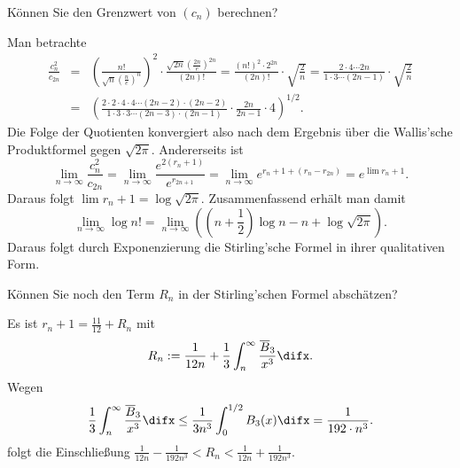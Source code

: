   \begin{frage}
    Können Sie den Grenzwert von $(c_n)$ berechnen?
  \end{frage}

  \begin{antwort}
    Man betrachte  
    \begin{eqnarray*}
      \frac{c_n^2}{c_{2n} } &=& 
      \left( \frac{n!}{\sqrt{n} \left( \frac{n}{e} \right)^n } \right)^2 
      \cdot 
      \frac{ \sqrt{2n} \left( \frac{2n}{e} \right)^{2n} }{(2n)!}  =
      \frac{ (n!)^2 \cdot 2^{2n} }{ (2n)! } \cdot \sqrt{\frac{2}{n} } 
      =
      \frac{ 2\cdot 4 \cdots 2n }{ 1\cdot 3 \cdots (2n-1) } 
      \cdot \sqrt{\frac{2}{n} } \\
      &=& \left( 
        \frac{ 
          2\cdot 2\cdot 4\cdot 4 \cdots (2n-2)\cdot (2n-2) }
        { 1\cdot 3 \cdot 3 \cdots (2n-3)\cdot (2n-1) }
        \cdot\frac{2n}{ 2n-1} \cdot 4 
      \right)^{1/2}.
    \end{eqnarray*}
    Die Folge der Quotienten 
    konvergiert also nach dem Ergebnis über die 
    Wallis'sche Produktformel gegen $\sqrt{2\pi}$. 
    Andererseits ist 
    \[
    \lim_{n\to\infty} \frac{c_n^2}{c_{2n} } = \lim_{n\to\infty} 
    \frac{e^{2(r_n+1)}}{e^{r_{2n+1}}} = 
    \lim_{n\to\infty} e^{r_n+1 + (r_n-r_{2n})} = e^{\lim r_n+1}.
    \]
    Daraus folgt $\lim r_n+1 = \log \sqrt{2\pi}$. 
    Zusammenfassend erhält man damit   
    \[
    \lim_{n\to\infty} \log n! = 
    \lim_{n\to\infty}\left( 
      \left( n + \frac{1}{2} \right) \log n - n +
      \log\sqrt{2\pi} \right).
    \]
    Daraus folgt durch Exponenzierung die Stirling'sche Formel 
    in ihrer qualitativen Form.\AntEnd
  \end{antwort}

  \begin{frage}
    Können Sie noch den Term $R_n$ in der Stirling'schen 
    Formel abschätzen?
  \end{frage}

  \begin{antwort}
    Es ist $r_n+1=\frac{11}{12} +R_n$ mit
    \[
    R_n := 
    \frac{1}{12n}+ 
    \frac{1}{3} \int_n^\infty \frac{\overline{B}_3}{x^3} \difx.  
    \]
    Wegen 
    \begin{equation}
      \frac{1}{3} \int_n^\infty \frac{\overline{B}_3}{x^3} \difx 
      \le \frac{1}{3n^3} \int_0^{1/2} B_3(x) \difx = 
      \frac{1}{192\cdot n^3}.
      \notag
    \end{equation}
    folgt die Einschließung 
    $\frac{1}{12n}- \frac{1}{192n^3} < R_n < \frac{1}{12n} + \frac{1}{192n^3}$.
    \AntEnd 
  \end{antwort}

